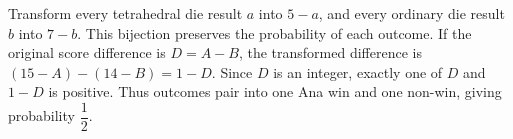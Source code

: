 Transform every tetrahedral die result $a$ into $5-a$, and every ordinary die result $b$ into $7-b$. This bijection preserves the probability of each outcome. If the original score difference is $D=A-B$, the transformed difference is $(15-A)-(14-B)=1-D$. Since $D$ is an integer, exactly one of $D$ and $1-D$ is positive. Thus outcomes pair into one Ana win and one non-win, giving probability $\boxed{\dfrac{1}{2}}$.
